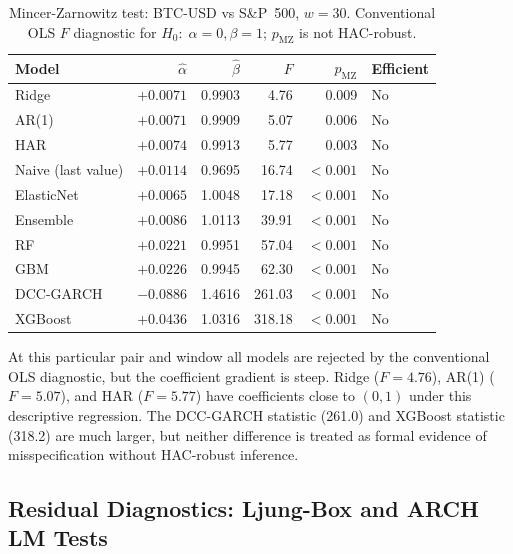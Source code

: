 \begin{table}[H]
    \centering
    \caption{Mincer-Zarnowitz test: BTC-USD vs S\&P~500, $w = 30$.
             Conventional OLS $F$ diagnostic for $H_0{:}\;\alpha=0, \beta=1$;
             $p_\text{MZ}$ is not HAC-robust.}
    \label{tab:mz_gspc_w30}
    \begin{tabular}{lrrrrl}
        \toprule
        Model & $\hat{\alpha}$ & $\hat{\beta}$ & $F$ & $p_\text{MZ}$ & Efficient \\
        \midrule
        Ridge       & $+0.0071$ & 0.9903 &   4.76 & 0.009 & No  \\
        AR(1)         & $+0.0071$ & 0.9909 &   5.07 & 0.006 & No  \\
        HAR         & $+0.0074$ & 0.9913 &   5.77 & 0.003 & No  \\
        Naive (last value) & $+0.0114$ & 0.9695 &  16.74 & $<0.001$ & No  \\
        ElasticNet  & $+0.0065$ & 1.0048 &  17.18 & $<0.001$ & No  \\
        Ensemble    & $+0.0086$ & 1.0113 &  39.91 & $<0.001$ & No  \\
        RF          & $+0.0221$ & 0.9951 &  57.04 & $<0.001$ & No  \\
        GBM         & $+0.0226$ & 0.9945 &  62.30 & $<0.001$ & No  \\
        DCC-GARCH  & $-0.0886$ & 1.4616 & 261.03 & $<0.001$ & No  \\
        XGBoost    & $+0.0436$ & 1.0316 & 318.18 & $<0.001$ & No  \\
        \bottomrule
    \end{tabular}
\end{table}

At this particular pair and window all models are rejected by the conventional
OLS diagnostic, but the coefficient gradient is steep. Ridge ($F = 4.76$), AR(1)
($F = 5.07$), and HAR ($F = 5.77$) have coefficients close to $(0, 1)$ under
this descriptive regression. The DCC-GARCH statistic (261.0) and XGBoost statistic
(318.2) are much larger, but neither difference is treated as formal evidence of
misspecification without HAC-robust inference.

\subsection{Residual Diagnostics: Ljung-Box and ARCH LM Tests}

